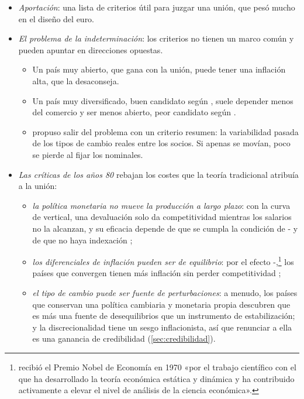 \documentclass[11pt]{article}
\begin{document}
\begin{itemize}
\item \emph{Aportación}: una lista de criterios útil para juzgar una unión, que pesó mucho en el diseño del euro.
\item \emph{El problema de la indeterminación}: los criterios no tienen un marco común y pueden apuntar en direcciones opuestas\nocite{Tavlas1994Theory}.
  \begin{itemize}
  \item Un país muy abierto, que gana con la unión, puede tener una inflación alta, que la desaconseja.
  \item Un país muy diversificado, buen candidato según , suele depender menos del comercio y ser menos abierto, peor candidato según \nocite{SanchisiMarco2014Economics}.
  \item \textcite{Vaubel1976Real} propuso salir del problema con un criterio resumen: la variabilidad pasada de los tipos de cambio reales entre los socios. Si apenas se movían, poco se pierde al fijar los nominales.
  \end{itemize}
\item \emph{Las críticas de los años 80} rebajan los costes que la teoría tradicional atribuía a la unión\nocite{DeGrauwe2022Economics}:
  \begin{itemize}
  \item \emph{la política monetaria no mueve la producción a largo plazo}: con la curva de  vertical, una devaluación solo da competitividad mientras los salarios no la alcanzan, y su eficacia depende de que se cumpla la condición de - y de que no haya indexación  ;
  \item \emph{los diferenciales de inflación pueden ser de equilibrio}: por el efecto -,\footnote{ recibió el Premio Nobel de Economía en 1970 «por el trabajo científico con el que ha desarrollado la teoría económica estática y dinámica y ha contribuido activamente a elevar el nivel de análisis de la ciencia económica»\nocite{Nobel1970Samuelson}.} los países que convergen tienen más inflación sin perder competitividad ;
  \item \emph{el tipo de cambio puede ser fuente de perturbaciones}: a menudo, los países que conservan una política cambiaria y monetaria propia descubren que es más una fuente de desequilibrios que un instrumento de estabilización; y la discrecionalidad tiene un sesgo inflacionista, así que renunciar a ella es una ganancia de credibilidad (\ref{sec:credibilidad}).

\end{itemize}
\end{itemize}
\end{document}
